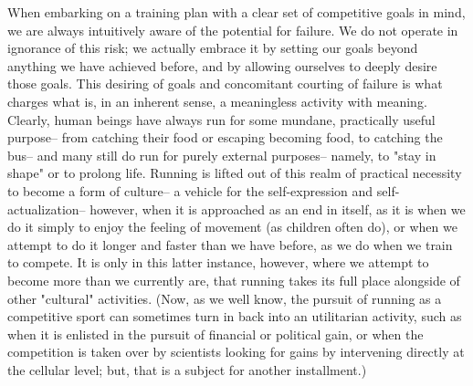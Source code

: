 When embarking on a training plan with a clear set of competitive goals in mind, we are always intuitively aware of the potential for failure. We do not operate in ignorance of this risk; we actually embrace it by setting our goals beyond anything we have achieved before, and by allowing ourselves to deeply desire those goals. This desiring of goals and concomitant courting of failure is what charges what is, in an inherent sense, a meaningless activity with meaning. Clearly, human beings have always run for some mundane, practically useful purpose-- from catching their food or escaping becoming food, to catching the bus-- and many still do run for purely external purposes-- namely, to "stay in shape" or to prolong life. Running is lifted out of this realm of practical necessity to become a form of culture-- a vehicle for the self-expression and self-actualization-- however, when it is approached as an end in itself, as it is when we do it simply to enjoy the feeling of movement (as children often do), or when we attempt to do it longer and faster than we have before, as we do when we train to compete. It is only in this latter instance, however, where we attempt to become more than we currently are, that running takes its full place alongside of other "cultural" activities. (Now, as we well know, the pursuit of running as a competitive sport can sometimes turn in back into an utilitarian activity, such as when it is enlisted in the pursuit of financial or political gain, or when the competition is taken over by scientists looking for gains by intervening directly at the cellular level; but, that is a subject for another installment.)

